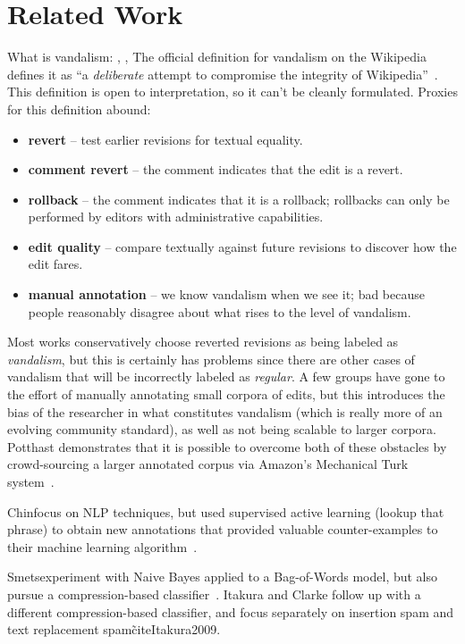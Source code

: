 \section{Related Work}

What is vandalism: \cite{wiki:vandalism}, \cite{Viegas2004},
\cite{Priedhorsky2007}
The official definition for vandalism on the Wikipedia defines it as
``a \textit{deliberate} attempt to compromise the integrity
of Wikipedia''~\cite{wiki:vandalism}.
This definition is open to interpretation, so it can't be cleanly
formulated.
Proxies for this definition abound:
\begin{itemize}
\item \textbf{revert} -- test earlier revisions for textual equality.
\item \textbf{comment revert} -- the comment indicates that the edit
    is a revert.
\item \textbf{rollback} -- the comment indicates that it is a
    rollback; rollbacks can only be performed by editors with
    administrative capabilities.
\item \textbf{edit quality} -- compare textually against future
    revisions to discover how the edit fares.
\item \textbf{manual annotation} -- we know vandalism when we see it;
    bad because people reasonably disagree about what rises to the
    level of vandalism.
\end{itemize}

Most works conservatively choose reverted revisions as being labeled
as \textit{vandalism}, but this is certainly has problems since there
are other cases of vandalism that will be incorrectly labeled as
\textit{regular}.
A few groups have gone to the effort of manually annotating small
corpora of edits, but this introduces the bias of the researcher in
what constitutes vandalism (which is really more of an evolving
community standard), as well as not being scalable to larger corpora.
Potthast demonstrates that it is possible to overcome both of these
obstacles by crowd-sourcing a larger annotated corpus via
Amazon's Mechanical Turk system~\cite{Potthast2010a}.

Chin\etal focus on NLP techniques, but used supervised active
learning (lookup that phrase) to obtain new annotations that
provided valuable counter-examples to their machine learning
algorithm~\cite{Chin2010}.

Smets\etal experiment with Naive Bayes applied to a Bag-of-Words
model, but also pursue a compression-based
classifier~\cite{Smets2008}.
Itakura and Clarke follow up with a different compression-based
classifier, and focus separately on insertion spam and
text replacement spam\~cite{Itakura2009}.

